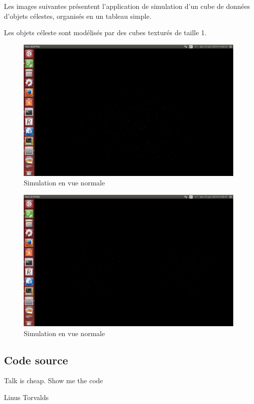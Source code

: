 \documentclass[a4paper,french,12pt]{article}
\begin{document}
		Les images suivantes présentent l'application de simulation d'un cube de données d'objets célestes, 
		organisés en un tableau simple.
		
		Les objets céleste sont modélisés par des cubes texturés de taille 1.
		
		\begin{figure}
			      \centering
			      \includegraphics[width=1.0\textwidth]{basic_normal.png}
			      \caption{Simulation en vue normale}
		\end{figure}
		
		\begin{figure}
			      \centering
			      \includegraphics[width=1.0\textwidth]{basic_oculus.png}
			      \caption{Simulation en vue normale}
		\end{figure}
		\FloatBarrier
		
	\newpage	
	\subsection{Code source}
	\epigraph{Talk is cheap. Show me the code}{Linus Torvalds}
	
\end{document}

